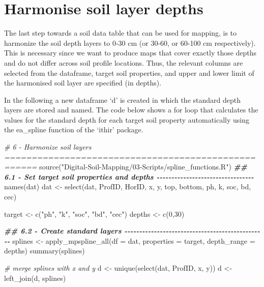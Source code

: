 \documentclass[
  10pt,
  b5paper,
  oneside]{book}
\newenvironment{Shaded}{\begin{snugshade}}{\end{snugshade}}
\newcommand{\AttributeTok}[1]{\textcolor[rgb]{0.77,0.63,0.00}{#1}}
\newcommand{\CommentTok}[1]{\textcolor[rgb]{0.56,0.35,0.01}{\textit{#1}}}
\newcommand{\DecValTok}[1]{\textcolor[rgb]{0.00,0.00,0.81}{#1}}
\newcommand{\DocumentationTok}[1]{\textcolor[rgb]{0.56,0.35,0.01}{\textbf{\textit{#1}}}}
\newcommand{\FunctionTok}[1]{\textcolor[rgb]{0.00,0.00,0.00}{#1}}
\newcommand{\NormalTok}[1]{#1}
\newcommand{\OtherTok}[1]{\textcolor[rgb]{0.56,0.35,0.01}{#1}}
\newcommand{\StringTok}[1]{\textcolor[rgb]{0.31,0.60,0.02}{#1}}
\begin{document}
\hypertarget{harmonise-soil-layer-depths}{%
\section{Harmonise soil layer depths}\label{harmonise-soil-layer-depths}}

The last step towards a soil data table that can be used for mapping, is to harmonize the soil depth layers to 0-30 cm (or 30-60, or 60-100 cm respectively). This is necessary since we want to produce maps that cover exactly those depths and do not differ across soil profile locations. Thus, the relevant columns are selected from the dataframe, target soil properties, and upper and lower limit of the harmonised soil layer are specified (in depths).

In the following a new dataframe `d' is created in which the standard depth layers are stored and named. The code below shows a for loop that calculates the values for the standard depth for each target soil property automatically using the ea\_spline function of the `ithir' package.

\begin{Shaded}
\begin{Highlighting}[]
\CommentTok{\# 6 {-} Harmonize soil layers ====================================================}
\FunctionTok{source}\NormalTok{(}\StringTok{"Digital{-}Soil{-}Mapping/03{-}Scripts/spline\_functions.R"}\NormalTok{) }
\DocumentationTok{\#\# 6.1 {-} Set target soil properties and depths {-}{-}{-}{-}{-}{-}{-}{-}{-}{-}{-}{-}{-}{-}{-}{-}{-}{-}{-}{-}{-}{-}{-}{-}{-}{-}{-}{-}{-}{-}{-}{-}{-}}
\FunctionTok{names}\NormalTok{(dat)}
\NormalTok{dat }\OtherTok{\textless{}{-}} \FunctionTok{select}\NormalTok{(dat, ProfID, HorID, x, y, top, bottom, ph, k, soc, bd, cec)}

\NormalTok{target }\OtherTok{\textless{}{-}} \FunctionTok{c}\NormalTok{(}\StringTok{"ph"}\NormalTok{, }\StringTok{"k"}\NormalTok{, }\StringTok{"soc"}\NormalTok{,  }\StringTok{"bd"}\NormalTok{, }\StringTok{"cec"}\NormalTok{)}
\NormalTok{depths }\OtherTok{\textless{}{-}} \FunctionTok{c}\NormalTok{(}\DecValTok{0}\NormalTok{,}\DecValTok{30}\NormalTok{)}

\DocumentationTok{\#\# 6.2 {-} Create standard layers {-}{-}{-}{-}{-}{-}{-}{-}{-}{-}{-}{-}{-}{-}{-}{-}{-}{-}{-}{-}{-}{-}{-}{-}{-}{-}{-}{-}{-}{-}{-}{-}{-}{-}{-}{-}{-}{-}{-}{-}{-}{-}{-}{-}{-}{-}{-}{-}}
\NormalTok{splines }\OtherTok{\textless{}{-}} \FunctionTok{apply\_mpspline\_all}\NormalTok{(}\AttributeTok{df =}\NormalTok{ dat, }\AttributeTok{properties =}\NormalTok{ target, }\AttributeTok{depth\_range =}\NormalTok{ depths)}
\FunctionTok{summary}\NormalTok{(splines)}

\CommentTok{\# merge splines with x and y}
\NormalTok{d }\OtherTok{\textless{}{-}} \FunctionTok{unique}\NormalTok{(}\FunctionTok{select}\NormalTok{(dat, ProfID, x, y))}
\NormalTok{d }\OtherTok{\textless{}{-}} \FunctionTok{left\_join}\NormalTok{(d, splines)}
\end{Highlighting}
\end{Shaded}
\end{document}
